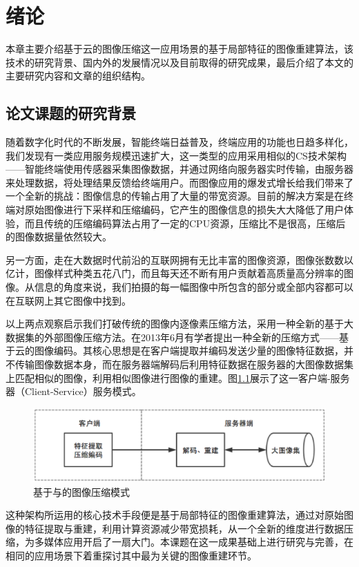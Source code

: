 
\chapter{绪论}
本章主要介绍基于云的图像压缩这一应用场景的基于局部特征的图像重建算法，该技术的研究背景、国内外的发展情况以及目前取得的研究成果，最后介绍了本文的主要研究内容和文章的组织结构。


\section{论文课题的研究背景}

随着数字化时代的不断发展，智能终端日益普及，终端应用的功能也日趋多样化，我们发现有一类应用服务规模迅速扩大，这一类型的应用采用相似的CS技术架构——智能终端使用传感器采集图像数据，并通过网络向服务器实时传输，由服务器来处理数据，将处理结果反馈给终端用户。而图像应用的爆发式增长给我们带来了一个全新的挑战：图像信息的传输占用了大量的带宽资源。目前的解决方案是在终端对原始图像进行下采样和压缩编码，它产生的图像信息的损失大大降低了用户体验，而且传统的压缩编码算法占用了一定的CPU资源，压缩比不是很高，压缩后的图像数据量依然较大。

另一方面，走在大数据时代前沿的互联网拥有无比丰富的图像资源，图像张数数以亿计，图像样式种类五花八门，而且每天还不断有用户贡献着高质量高分辨率的图像。从信息的角度来说，我们拍摄的每一幅图像中所包含的部分或全部内容都可以在互联网上其它图像中找到。

以上两点观察启示我们打破传统的图像内逐像素压缩方法，采用一种全新的基于大数据集的外部图像压缩方法。在2013年6月有学者\cite{Yue:2013gl}提出一种全新的压缩方式——基于云的图像编码。其核心思想是在客户端提取并编码发送少量的图像特征数据，并不传输图像数据本身，而在服务器端解码后利用特征数据在服务器的大图像数据集上匹配相似的图像，利用相似图像进行图像的重建。图\ref{fig:overview}展示了这一客户端-服务器（Client-Service）服务模式。
\begin{figure}
\centering\includegraphics[width=14cm]{imgs/ch1/overview}
\caption{基于与的图像压缩模式}
\label{fig:overview}
\end{figure}
这种架构所运用的核心技术手段便是基于局部特征的图像重建算法，通过对原始图像的特征提取与重建，利用计算资源减少带宽损耗，从一个全新的维度进行数据压缩，为多媒体应用开启了一扇大门。本课题在这一成果基础上进行研究与完善，在相同的应用场景下着重探讨其中最为关键的图像重建环节。

